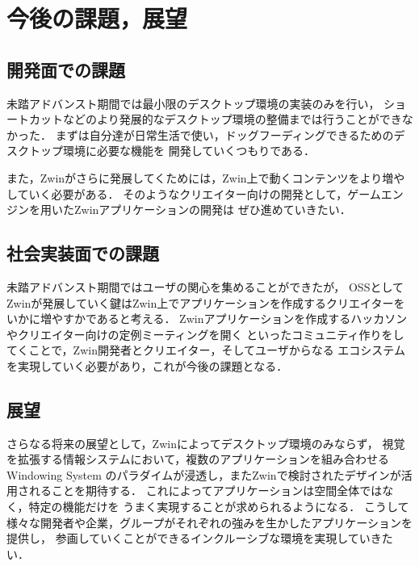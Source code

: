 \section{今後の課題，展望}

\subsection{開発面での課題}

未踏アドバンスト期間では最小限のデスクトップ環境の実装のみを行い，
ショートカットなどのより発展的なデスクトップ環境の整備までは行うことができなかった．
まずは自分達が日常生活で使い，ドッグフーディングできるためのデスクトップ環境に必要な機能を
開発していくつもりである．

また，Zwinがさらに発展してくためには，Zwin上で動くコンテンツをより増やしていく必要がある．
そのようなクリエイター向けの開発として，ゲームエンジンを用いたZwinアプリケーションの開発は
ぜひ進めていきたい．

\subsection{社会実装面での課題}

未踏アドバンスト期間ではユーザの関心を集めることができたが，
OSSとしてZwinが発展していく鍵はZwin上でアプリケーションを作成するクリエイターを
いかに増やすかであると考える．
Zwinアプリケーションを作成するハッカソンやクリエイター向けの定例ミーティングを開く
といったコミュニティ作りをしてくことで，Zwin開発者とクリエイター，そしてユーザからなる
エコシステムを実現していく必要があり，これが今後の課題となる．

\subsection{展望}

さらなる将来の展望として，Zwinによってデスクトップ環境のみならず，
視覚を拡張する情報システムにおいて，複数のアプリケーションを組み合わせるWindowing System
のパラダイムが浸透し，またZwinで検討されたデザインが活用されることを期待する．
これによってアプリケーションは空間全体ではなく，特定の機能だけを
うまく実現することが求められるようになる．
こうして様々な開発者や企業，グループがそれぞれの強みを生かしたアプリケーションを提供し，
参画していくことができるインクルーシブな環境を実現していきたい．
